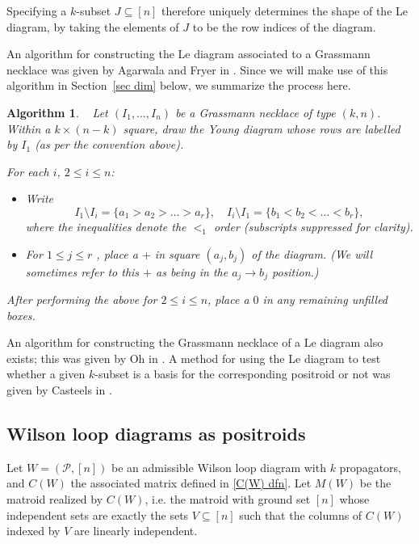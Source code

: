 \documentclass[11pt]{article}
\newcommand{\cP}{\mathcal{P}}
\newtheorem{algorithm}[thm]{Algorithm}
\theoremstyle{remark}
\theoremstyle{definition}
\begin{document}
Specifying a $k$-subset $J \subseteq [n]$ therefore uniquely determines the shape of the Le diagram, by taking the elements of $J$ to be the row indices of the diagram.

An algorithm for constructing the Le diagram associated to a Grassmann necklace was given by Agarwala and Fryer in \cite{reversingOh}. Since we will make use of this algorithm in Section~\ref{sec dim} below, we summarize the process here.
\begin{algorithm}\label{alg:GN to Le} \ \cite[Algorithm 2]{reversingOh}
Let $(I_1,\dots,I_n)$ be a Grassmann necklace of type $(k,n)$. Within a $k \times(n-k)$ square, draw the Young diagram whose rows are labelled by $I_1$ (as per the convention above).

For each $i$, $2 \leq i \leq n$:
\begin{itemize}
\item Write \[I_1 \setminus I_i = \{a_1 > a_2 > \dots > a_r\}, \quad I_i \setminus I_1 = \{b_1 < b_2 < \dots < b_r\},\]
where the inequalities denote the $<_1$ order (subscripts suppressed for clarity).
\item For $1 \leq j \leq r$ , place a $+$ in square $(a_j,b_j)$ of the diagram. (We will sometimes refer to this $+$ as being {\em in the $a_j \rightarrow b_j$ position}.)
\end{itemize}
After performing the above for $2 \leq i \leq n$, place a $0$ in any remaining unfilled boxes.
\end{algorithm}

An algorithm for constructing the Grassmann necklace of a Le diagram also exists; this was given by Oh in \cite{Oh}. A method for using the Le diagram to test whether a given $k$-subset is a basis for the corresponding positroid or not was given by Casteels in \cite{CasteelsPaths}.



\subsection{Wilson loop diagrams as positroids}\label{sec:WLD as positroids}


Let $W = (\cP,[n])$ be an admissible Wilson loop diagram with $k$ propagators, and $C(W)$ the associated matrix defined in \eqref{C(W) dfn}. Let $M(W)$ be the matroid realized by $C(W)$, i.e. the matroid with ground set $[n]$ whose independent sets are exactly the sets $V \subseteq [n]$ such that the columns of $C(W)$ indexed by $V$ are linearly independent.
\end{document}
